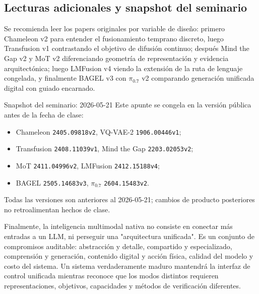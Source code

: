 \subsection{Lecturas adicionales y snapshot del seminario}

Se recomienda leer los papers originales por variable de diseño: primero Chameleon v2 para entender el fusionamiento temprano discreto, luego Transfusion v1 contrastando el objetivo de difusión continuo; después Mind the Gap v2 y MoT v2 diferenciando geometría de representación y evidencia arquitectónica; luego LMFusion v4 viendo la extensión de la ruta de lenguaje congelada, y finalmente BAGEL v3 con $\pi_{0.7}$ v2 comparando generación unificada digital con guiado encarnado.

\begin{knowledgebox}{Snapshot del seminario: 2026-05-21}
Este apunte se congela en la versión pública antes de la fecha de clase:
\begin{itemize}
  \item Chameleon \texttt{2405.09818v2}, VQ-VAE-2 \texttt{1906.00446v1};
  \item Transfusion \texttt{2408.11039v1}, Mind the Gap \texttt{2203.02053v2};
  \item MoT \texttt{2411.04996v2}, LMFusion \texttt{2412.15188v4};
  \item BAGEL \texttt{2505.14683v3}, $\pi_{0.7}$ \texttt{2604.15483v2}.
\end{itemize}
Todas las versiones son anteriores al 2026-05-21; cambios de producto posteriores no retroalimentan hechos de clase.
\end{knowledgebox}

Finalmente, la inteligencia multimodal nativa no consiste en conectar más entradas a un LLM, ni perseguir una "arquitectura unificada". Es un conjunto de compromisos auditable: abstracción y detalle, compartido y especializado, comprensión y generación, contenido digital y acción física, calidad del modelo y costo del sistema. Un sistema verdaderamente maduro mantendrá la interfaz de control unificada mientras reconoce que los modos distintos requieren representaciones, objetivos, capacidades y métodos de verificación diferentes.



